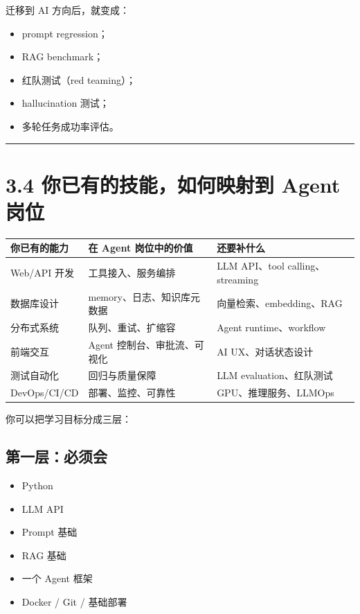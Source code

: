 迁移到 AI 方向后，就变成：


\begin{itemize}[leftmargin=2em]
\item prompt regression；
\item RAG benchmark；
\item 红队测试（red teaming）；
\item hallucination 测试；
\item 多轮任务成功率评估。
\end{itemize}

\bigskip\hrule\bigskip

\section{3.4 你已有的技能，如何映射到 Agent 岗位}

\begingroup
\scriptsize
\setlength{\tabcolsep}{3pt}
\begin{longtable}{|p{}|p{}|p{}|}
\hline
你已有的能力 & 在 Agent 岗位中的价值 & 还要补什么 \\ \hline
Web/API 开发 & 工具接入、服务编排 & LLM API、tool calling、streaming \\ \hline
数据库设计 & memory、日志、知识库元数据 & 向量检索、embedding、RAG \\ \hline
分布式系统 & 队列、重试、扩缩容 & Agent runtime、workflow \\ \hline
前端交互 & Agent 控制台、审批流、可视化 & AI UX、对话状态设计 \\ \hline
测试自动化 & 回归与质量保障 & LLM evaluation、红队测试 \\ \hline
DevOps/CI/CD & 部署、监控、可靠性 & GPU、推理服务、LLMOps \\ \hline
\end{longtable}
\endgroup

你可以把学习目标分成三层：


\subsection{第一层：必须会}

\begin{itemize}[leftmargin=2em]
\item Python
\item LLM API
\item Prompt 基础
\item RAG 基础
\item 一个 Agent 框架
\item Docker / Git / 基础部署
\end{itemize}

